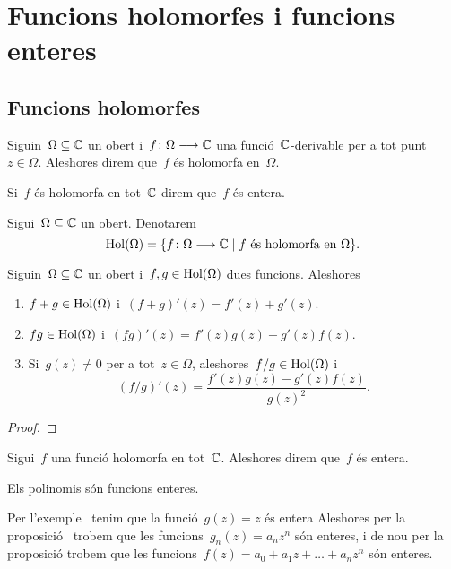 \documentclass[../Apunts.tex]{subfiles}
\begin{document}
\section{Funcions holomorfes i funcions enteres}
    \subsection{Funcions holomorfes}
    \begin{definition}
        \label{def:funció holomorfa}
        Siguin~\(\Omega\subseteq\mathbb{C}\) un obert
        i~\(f\colon\Omega\longrightarrow\mathbb{C}\) una funció~\(\mathbb{C}\)-derivable per
        a tot punt~\(z\in\Omega\).
        Aleshores direm que~\(f\) és holomorfa en~\(\Omega\).
        
        Si~\(f\) és holomorfa en tot~\(\mathbb{C}\) direm que~\(f\) és entera.
    \end{definition}
    \begin{notation}
        Sigui~\(\Omega\subseteq\mathbb{C}\) un obert.
        Denotarem
        \[
            \operatorname{Hol}(\Omega)
            =\{f\colon\Omega\longrightarrow\mathbb{C}\mid f\text{ és holomorfa en }\Omega\}.
        \]
    \end{notation}
    \begin{proposition}
        \label{prop:derivació de funcions holomorfes}
        Siguin~\(\Omega\subseteq\mathbb{C}\) un obert i~\(f,g\in\operatorname{Hol}(\Omega)\) dues
        funcions.
        Aleshores
        \begin{enumerate}
            \item \(f+g\in\operatorname{Hol}(\Omega)\) i~\((f+g)'(z)=f'(z)+g'(z)\).
            \item \(fg\in\operatorname{Hol}(\Omega)\) i~\((fg)'(z)=f'(z)g(z)+g'(z)f(z)\).
            \item Si~\(g(z)\neq0\) per a tot~\(z\in\Omega\),
                aleshores~\(f/g\in\operatorname{Hol}(\Omega)\) i
                \[(f/g)'(z)=\frac{f'(z)g(z)-g'(z)f(z)}{g(z)^{2}}.\]
        \end{enumerate}
    \end{proposition}
    \begin{proof}
    \end{proof}
    \begin{definition}
        \label{def:funció entera}
        Sigui~\(f\) una funció holomorfa en tot~\(\mathbb{C}\).
        Aleshores direm que~\(f\) és entera.
    \end{definition}
    \begin{example}
        Els polinomis són funcions enteres.
    \end{example}
    \begin{solution}
        Per l'exemple~ tenim que la
        funció~\(g(z)=z\) és entera
        Aleshores per la proposició~
        trobem que les funcions~\(g_{n}(z)=a_{n}z^{n}\) són enteres, i de nou
        per la proposició trobem que les
        funcions~\(f(z)=a_{0}+a_{1}z+\dots+a_{n}z^{n}\) són enteres.
    \end{solution}
\end{document}
